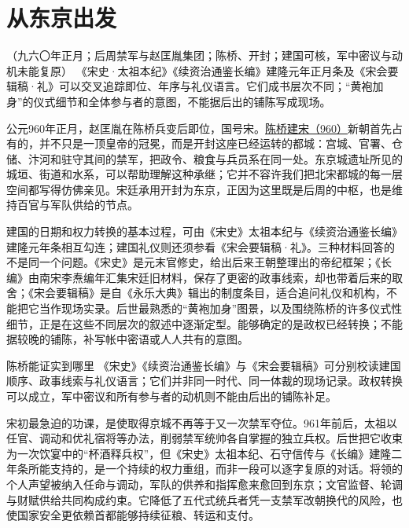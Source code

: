 \section{从东京出发}

\begin{event}{（九六〇年正月；后周禁军与赵匡胤集团；陈桥、开封；建国可核，军中密议与动机未能复原）}
《宋史·太祖本纪》《续资治通鉴长编》建隆元年正月条及《宋会要辑稿·礼》可以交叉追踪即位、年序与礼仪语言。它们成书层次不同；“黄袍加身”的仪式细节和全体参与者的意图，不能据后出的铺陈写成现场。
\end{event}

公元960年正月，赵匡胤在陈桥兵变后即位，国号宋。\hyperlink{evt:NS-0960-CHENQIAO}{陈桥建宋（960）}新朝首先占有的，并不只是一顶皇帝的冠冕，而是开封这座已经运转的都城：宫城、官署、仓储、汴河和驻守其间的禁军，把政令、粮食与兵员系在同一处。东京城遗址所见的城垣、街道和水系，可以帮助理解这种承继；它并不容许我们把北宋都城的每一层空间都写得仿佛亲见。宋廷承用开封为东京，正因为这里既是后周的中枢，也是维持百官与军队供给的节点。



建国的日期和权力转换的基本过程，可由《宋史》太祖本纪与《续资治通鉴长编》建隆元年条相互勾连；建国礼仪则还须参看《宋会要辑稿·礼》。三种材料回答的不是同一个问题。《宋史》是元末官修史，给出后来王朝整理出的帝纪框架；《长编》由南宋李焘编年汇集宋廷旧材料，保存了更密的政事线索，却也带着后来的取舍；《宋会要辑稿》是自《永乐大典》辑出的制度条目，适合追问礼仪和机构，不能把它当作现场实录。后世最熟悉的“黄袍加身”图景，以及围绕陈桥的许多仪式性细节，正是在这些不同层次的叙述中逐渐定型。能够确定的是政权已经转换；不能据较晚的铺陈，补写帐中密语或人人共有的意图。

\begin{sourcenote}{陈桥能证实到哪里}
《宋史》《续资治通鉴长编》与《宋会要辑稿》可分别校读建国顺序、政事线索与礼仪语言；它们并非同一时代、同一体裁的现场记录。政权转换可以成立，军中密议和所有参与者的动机则不能由后出的铺陈补足。
\end{sourcenote}

宋初最急迫的功课，是使取得京城不再等于又一次禁军夺位。961年前后，太祖以任官、调动和优礼宿将等办法，削弱禁军统帅各自掌握的独立兵权。后世把它收束为一次饮宴中的“杯酒释兵权”，但《宋史》太祖本纪、石守信传与《长编》建隆二年条所能支持的，是一个持续的权力重组，而非一段可以逐字复原的对话。将领的个人声望被纳入任命与调动，军队的供养和指挥愈来愈回到东京；文官监督、轮调与财赋供给共同构成约束。它降低了五代式统兵者凭一支禁军改朝换代的风险，也使国家安全更依赖首都能够持续征粮、转运和支付。

